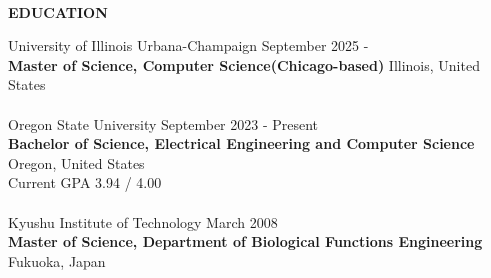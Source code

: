 \begin{flushleft}
	\hrulefill \\
	\begin{large}
		\begin{center}\textbf{EDUCATION}\end{center}
	\end{large}
\end{flushleft}
University of Illinois Urbana-Champaign \hfill September 2025 - \\
\textbf{Master of Science, Computer Science(Chicago-based)}  \hfill Illinois, United States\\
\\
Oregon State University \hfill September 2023 - Present\\
\textbf{Bachelor of Science, Electrical Engineering and Computer Science}  \hfill Oregon, United States\\
Current GPA 3.94 / 4.00\\
\\
Kyushu Institute of Technology \hfill March 2008\\
\textbf{Master of Science, Department of Biological Functions Engineering} \hfill Fukuoka, Japan\\
